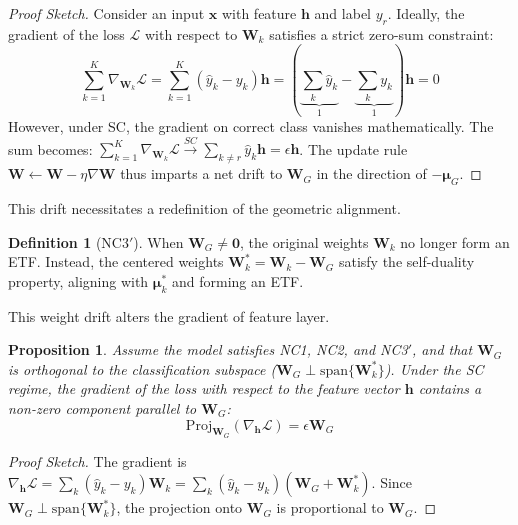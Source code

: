 \documentclass{article}
\theoremstyle{plain}
\newtheorem{proposition}[theorem]{Proposition}
\theoremstyle{definition}
\newtheorem{definition}[theorem]{Definition}
\theoremstyle{remark}
\begin{document}
\begin{proof}[Proof Sketch]
Consider an input $\bm{x}$ with feature $\bm{h}$ and label $y_r$. Ideally, the gradient of the loss $\mathcal{L}$ with respect to $\bm{W}_k$ satisfies a strict zero-sum constraint:
\begin{equation}
    \sum_{k=1}^K \nabla_{\bm{W}_k} \mathcal{L} = \sum_{k=1}^K (\hat{y}_k - y_k) \bm{h} = \left(\underbrace{\sum_k \hat{y}_k}_{1} - \underbrace{\sum_k y_k}_{1}\right) \bm{h} = 0 \label{eq:zero_sum}
\end{equation}  
However, under SC, the gradient on correct class vanishes mathematically. The sum becomes:
    $\sum_{k=1}^K \nabla_{\bm{W}_k} \mathcal{L} \xrightarrow{SC} \sum_{k \neq r} \hat{y}_k \bm{h} = \epsilon \bm{h}$.
The update rule $\bm{W} \leftarrow \bm{W} - \eta \nabla \bm{W}$ thus imparts a net drift to $\bm{W}_G$ in the direction of $-\bm{\mu}_G$.
\end{proof}

This drift necessitates a redefinition of the geometric alignment.

\begin{definition}[NC3$'$]
When $\bm{W}_G \neq \bm{0}$, the original weights $\bm{W}_k$ no longer form an ETF. Instead, the centered weights $\bm{W}_k^* = \bm{W}_k - \bm{W}_G$ satisfy the self-duality property, aligning with $\bm{\mu}_k^*$ and forming an ETF.
\end{definition}

This weight drift alters the gradient of feature layer.
\begin{proposition}
\label{thm:nfc_force}
Assume the model satisfies NC1, NC2, and NC3$'$, and that $\bm{W}_G$ is orthogonal to 
the classification subspace ($\bm{W}_G \perp \text{span}\{\bm{W}_k^*\}$). 
Under the SC regime, the gradient of the loss with respect to the feature vector $\bm{h}$ contains a non-zero component parallel to $\bm{W}_G$:
\begin{equation}
    \text{Proj}_{\bm{W}_G}(\nabla_{\bm{h}} \mathcal{L}) = \epsilon \bm{W}_G
\end{equation}
\end{proposition}

\begin{proof}[Proof Sketch]
The gradient is $\nabla_{\bm{h}} \mathcal{L} = \sum_k (\hat{y}_k - y_k)\bm{W}_k=\sum_k (\hat{y}_k - y_k)(\bm{W}_G + \bm{W}_k^*)$. 
Since $\bm{W}_G \perp \text{span}\{\bm{W}_k^*\}$, the projection onto $\bm{W}_G$ is proportional to $\bm{W}_G$.
\end{proof}
\end{document}
